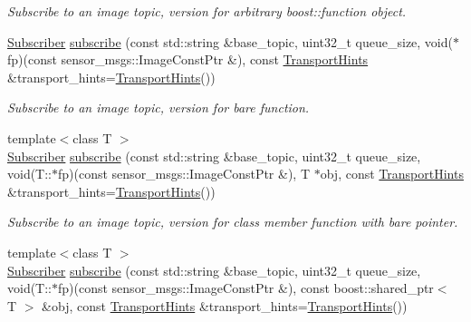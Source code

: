 \begin{DoxyCompactItemize}
\begin{DoxyCompactList}\small\item\em Subscribe to an image topic, version for arbitrary boost\-::function object. \end{DoxyCompactList}\item 
\hypertarget{classimage__transport_1_1_image_transport_a1a2ae66942f19a127739fe062236e7f3}{\hyperlink{classimage__transport_1_1_subscriber}{Subscriber} \hyperlink{classimage__transport_1_1_image_transport_a1a2ae66942f19a127739fe062236e7f3}{subscribe} (const std\-::string \&base\-\_\-topic, uint32\-\_\-t queue\-\_\-size, void($\ast$fp)(const sensor\-\_\-msgs\-::\-Image\-Const\-Ptr \&), const \hyperlink{classimage__transport_1_1_transport_hints}{Transport\-Hints} \&transport\-\_\-hints=\hyperlink{classimage__transport_1_1_transport_hints}{Transport\-Hints}())}\label{classimage__transport_1_1_image_transport_a1a2ae66942f19a127739fe062236e7f3}

\begin{DoxyCompactList}\small\item\em Subscribe to an image topic, version for bare function. \end{DoxyCompactList}\item 
\hypertarget{classimage__transport_1_1_image_transport_a0016526367fba9df0ca326d570e84bb2}{{\footnotesize template$<$class T $>$ }\\\hyperlink{classimage__transport_1_1_subscriber}{Subscriber} \hyperlink{classimage__transport_1_1_image_transport_a0016526367fba9df0ca326d570e84bb2}{subscribe} (const std\-::string \&base\-\_\-topic, uint32\-\_\-t queue\-\_\-size, void(T\-::$\ast$fp)(const sensor\-\_\-msgs\-::\-Image\-Const\-Ptr \&), T $\ast$obj, const \hyperlink{classimage__transport_1_1_transport_hints}{Transport\-Hints} \&transport\-\_\-hints=\hyperlink{classimage__transport_1_1_transport_hints}{Transport\-Hints}())}\label{classimage__transport_1_1_image_transport_a0016526367fba9df0ca326d570e84bb2}

\begin{DoxyCompactList}\small\item\em Subscribe to an image topic, version for class member function with bare pointer. \end{DoxyCompactList}\item 
\hypertarget{classimage__transport_1_1_image_transport_aadba56ce8213440b0de988aadd27e2bf}{{\footnotesize template$<$class T $>$ }\\\hyperlink{classimage__transport_1_1_subscriber}{Subscriber} \hyperlink{classimage__transport_1_1_image_transport_aadba56ce8213440b0de988aadd27e2bf}{subscribe} (const std\-::string \&base\-\_\-topic, uint32\-\_\-t queue\-\_\-size, void(T\-::$\ast$fp)(const sensor\-\_\-msgs\-::\-Image\-Const\-Ptr \&), const boost\-::shared\-\_\-ptr$<$ T $>$ \&obj, const \hyperlink{classimage__transport_1_1_transport_hints}{Transport\-Hints} \&transport\-\_\-hints=\hyperlink{classimage__transport_1_1_transport_hints}{Transport\-Hints}())}\label{classimage__transport_1_1_image_transport_aadba56ce8213440b0de988aadd27e2bf}


\end{DoxyCompactItemize}
